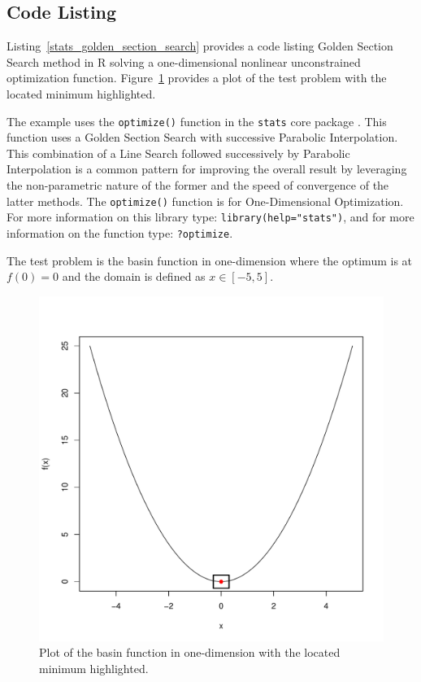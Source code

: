 \subsection{Code Listing}
Listing~\ref{stats_golden_section_search} provides a code listing Golden Section Search method in R solving a one-dimensional nonlinear unconstrained optimization function. Figure~\ref{plot:golden_section_search_result} provides a plot of the test problem with the located minimum highlighted.

The example uses the \texttt{optimize()} function in the \texttt{stats} core package \cite{RDevelopmentCoreTeam2011a}. This function uses a Golden Section Search with successive Parabolic Interpolation. This combination of a Line Search followed successively by Parabolic Interpolation is a common pattern for improving the overall result by leveraging the non-parametric nature of the former and the speed of convergence of the latter methods. The \texttt{optimize()} function is for One-Dimensional Optimization. For more information on this library type: \texttt{library(help="stats")}, and for more information on the function type: \texttt{?optimize}.

The test problem is the basin function in one-dimension where the optimum is at $f(0)=0$ and the domain is defined as $x \in [-5,5]$. 



\begin{figure}[htp]
\centering
\includegraphics[scale=0.45]{a_optimization/golden_section_search_result.pdf}
\caption{Plot of the basin function in one-dimension with the located minimum highlighted.}
\label{plot:golden_section_search_result}
\end{figure}

